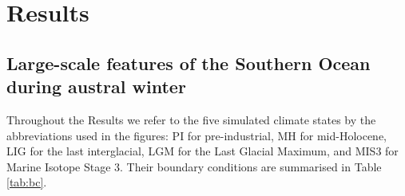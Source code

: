 \documentclass[pdflatex,sn-nature]{sn-jnl}
\begin{document}


\section{Results}

\subsection{Large-scale features of the Southern Ocean during austral winter}

Throughout the Results we refer to the five simulated climate states by the abbreviations used in the figures: PI for pre-industrial, MH for mid-Holocene, LIG for the last interglacial, LGM for the Last Glacial Maximum, and MIS3 for Marine Isotope Stage 3. Their boundary conditions are summarised in Table \ref{tab:bc}.
\end{document}

